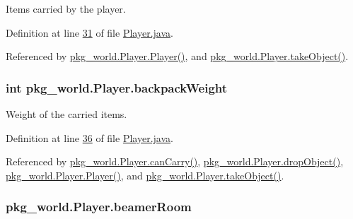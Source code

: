 Items carried by the player. 



Definition at line \hyperlink{Player_8java_source_l00031}{31} of file \hyperlink{Player_8java_source}{Player.\-java}.



Referenced by \hyperlink{Player_8java_source_l00068}{pkg\-\_\-world.\-Player.\-Player()}, and \hyperlink{Player_8java_source_l00202}{pkg\-\_\-world.\-Player.\-take\-Object()}.

\hypertarget{classpkg__world_1_1Player_a19ed9d4d1b17f409f106142ec2fd68a3}{
\subsubsection[{backpack\-Weight}]{\setlength{\rightskip}{0pt plus 5cm}int pkg\-\_\-world.\-Player.\-backpack\-Weight\hspace{0.3cm}{\ttfamily [private]}}}\label{classpkg__world_1_1Player_a19ed9d4d1b17f409f106142ec2fd68a3}


Weight of the carried items. 



Definition at line \hyperlink{Player_8java_source_l00036}{36} of file \hyperlink{Player_8java_source}{Player.\-java}.



Referenced by \hyperlink{Player_8java_source_l00194}{pkg\-\_\-world.\-Player.\-can\-Carry()}, \hyperlink{Player_8java_source_l00211}{pkg\-\_\-world.\-Player.\-drop\-Object()}, \hyperlink{Player_8java_source_l00068}{pkg\-\_\-world.\-Player.\-Player()}, and \hyperlink{Player_8java_source_l00202}{pkg\-\_\-world.\-Player.\-take\-Object()}.

\hypertarget{classpkg__world_1_1Player_aadfcdea19eefea1137932f9329c08209}{
\subsubsection[{beamer\-Room}]{ pkg\-\_\-world.\-Player.\-beamer\-Room\hspace{0.3cm}{\ttfamily [private]}}}\label{classpkg__world_1_1Player_aadfcdea19eefea1137932f9329c08209}


